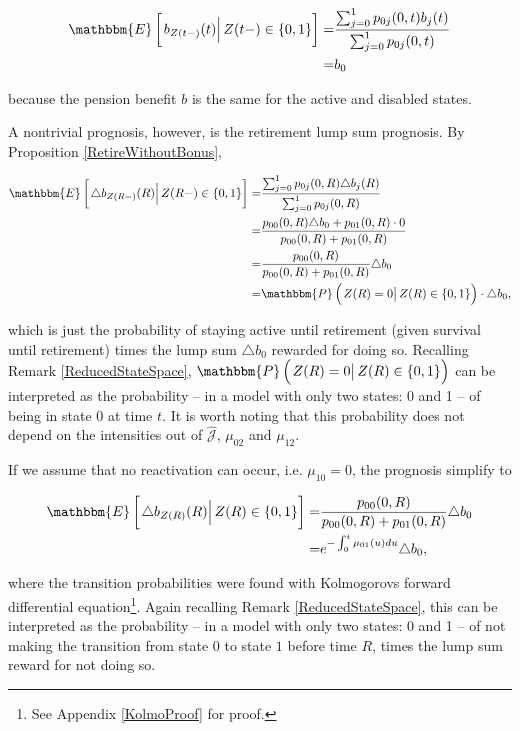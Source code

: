 \documentclass{book}
\newcommand{\1}[1]{\mathbbm{1}_{\left\lbrace #1 \right\rbrace}}
\newcommand{\econd}[2][def]{\mathbbm{E} \left[ \left. #1 \right| #2 \right]}
\newcommand{\pcond}[2][def]{\mathbbm{P} \left( \left. #1 \right| #2 \right)}
\theoremstyle{break}
\theoremstyle{remark}
\numberwithin{equation}{section}
\begin{document}
\begin{align*}
    \econd[b_{Z(t-)} (t)]{Z(t-) \in \{ 0,1 \}} =& \frac{\sum_{j = 0}^1 p_{0j}(0,t) b_j(t)}{\sum_{j = 0}^1 p_{0j}(0,t)} \\
    =& b_0
\end{align*}

because the pension benefit $b$ is the same for the active and disabled states.

A nontrivial prognosis, however, is the retirement lump sum prognosis. By Proposition \ref{RetireWithoutBonus},

\begin{align*}
    \econd[\triangle b_{Z(R-)} (R)]{Z(R-) \in \{ 0,1 \}} =& \frac{\sum_{j = 0}^1 p_{0j}(0,R) \triangle b_j(R)}{\sum_{j = 0}^1 p_{0j}(0,R)} \\
    =&\frac{p_{00}(0,R) \triangle b_0 + p_{01}(0,R) \cdot 0}{p_{00}(0,R) + p_{01}(0,R)} \\
    =& \frac{p_{00}(0,R)}{p_{00}(0,R) + p_{01}(0,R)} \triangle b_0 \\
    =& \pcond[Z(R) = 0]{Z(R) \in \{ 0,1 \}} \cdot \triangle b_0,
\end{align*}
    
which is just the probability of staying active until retirement (given survival until retirement) times the lump sum $\triangle b_0$ rewarded for doing so. Recalling Remark \ref{ReducedStateSpace}, $\pcond[Z(R) = 0]{Z(R) \in \{ 0,1 \}}$ can be interpreted as the probability -- in a model with only two states: 0 and 1 -- of being in state 0 at time $t$. It is worth noting that this probability does not depend on the intensities out of $\hat{\mathcal{J}}$, $\mu_{02}$ and $\mu_{12}$.

If we assume that no reactivation can occur, i.e. $\mu_{10}=0$, the prognosis simplify to

\begin{align*}
\econd[\triangle b_{Z(R)} (R)]{Z(R) \in \{ 0,1 \}} =& \frac{p_{00}(0,R)}{p_{00}(0,R) + p_{01}(0,R)} \triangle b_0 \\
=& e^{-\int_0^t \mu_{01}(u)du} \triangle b_0,
\end{align*}

where the transition probabilities were found with Kolmogorovs forward differential equation\footnote{See Appendix \ref{KolmoProof} for proof.}. Again recalling Remark \ref{ReducedStateSpace}, this can be interpreted as the probability -- in a model with only two states: 0 and 1 -- of not making the transition from state $0$ to state $1$ before time $R$, times the lump sum reward for not doing so.
\end{document}
